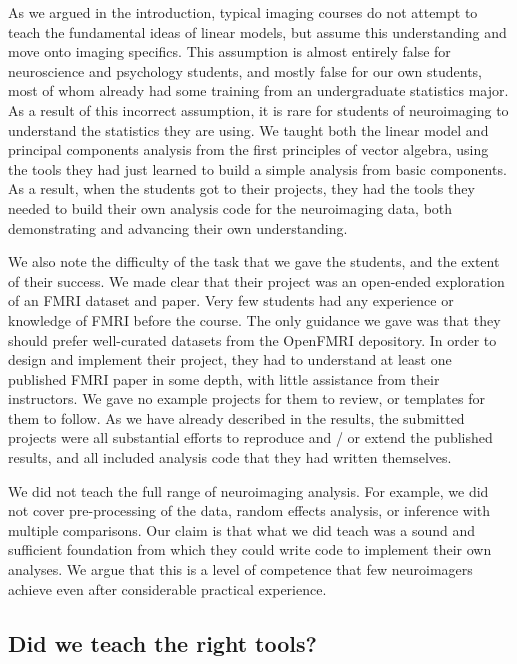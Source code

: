 As we argued in the introduction, typical imaging courses do not attempt to
teach the fundamental ideas of linear models, but assume this understanding
and move onto imaging specifics.  This assumption is almost entirely false for
neuroscience and psychology students, and mostly false for our own
students, most of whom already had some training from an undergraduate
statistics major. As a result of this incorrect assumption, it is rare for
students of neuroimaging to understand the statistics they are using.  We
taught both the linear model and principal components analysis from the first
principles of vector algebra, using the tools they had just learned to build a
simple analysis from basic components.  As a result, when the students got to
their projects, they had the tools they needed to build their own analysis
code for the neuroimaging data, both demonstrating and advancing their own
understanding.

We also note the difficulty of the task that we gave the students, and the
extent of their success.  We made clear that their project was an open-ended
exploration of an FMRI dataset and paper.  Very few students had any
experience or knowledge of FMRI before the course. The only guidance we gave
was that they should prefer well-curated datasets from the OpenFMRI
depository.  In order to design and implement their project, they had to
understand at least one published FMRI paper in some depth, with little
assistance from their instructors.  We gave no example projects for them to
review, or templates for them to follow.  As we have already described in the
results, the submitted projects were all substantial efforts to reproduce and
/ or extend the published results, and all included analysis code that they
had written themselves.

We did not teach the full range of neuroimaging analysis.  For example, we did
not cover pre-processing of the data, random effects analysis, or inference
with multiple comparisons.   Our claim is that what we did teach was a sound
and sufficient foundation from which they could write code to implement their
own analyses.  We argue that this is a level of competence that few
neuroimagers achieve even after considerable practical experience.

\subsection{Did we teach the right tools?}

